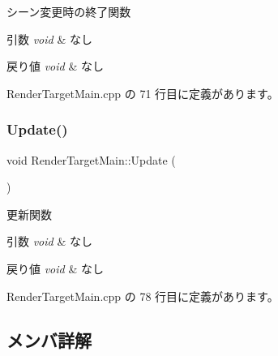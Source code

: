 シーン変更時の終了関数 


\begin{DoxyParams}{引数}
{\em void} & なし \\
\hline
\end{DoxyParams}

\begin{DoxyRetVals}{戻り値}
{\em void} & なし \\
\hline
\end{DoxyRetVals}


 Render\+Target\+Main.\+cpp の 71 行目に定義があります。

\mbox{\label{class_render_target_main_a5c25049decc949b019147c4c94828517}} 
\subsubsection{\texorpdfstring{Update()}{Update()}}
{\footnotesize\ttfamily void Render\+Target\+Main\+::\+Update (\begin{DoxyParamCaption}{ }\end{DoxyParamCaption})}



更新関数 


\begin{DoxyParams}{引数}
{\em void} & なし \\
\hline
\end{DoxyParams}

\begin{DoxyRetVals}{戻り値}
{\em void} & なし \\
\hline
\end{DoxyRetVals}


 Render\+Target\+Main.\+cpp の 78 行目に定義があります。



\subsection{メンバ詳解}
\mbox{\label{class_render_target_main_ad677e34abb5ef7673d8ab52f47d8729e}} 
